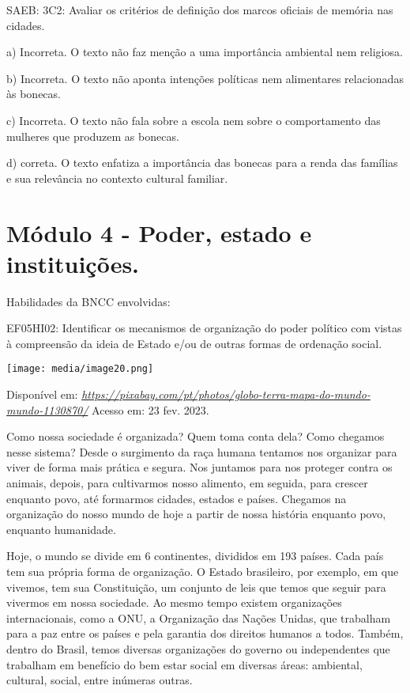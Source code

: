 SAEB: 3C2: Avaliar os critérios de definição dos marcos oficiais de
memória nas cidades.

a) Incorreta. O texto não faz menção a uma importância ambiental nem
religiosa.

b) Incorreta. O texto não aponta intenções políticas nem alimentares
relacionadas às bonecas.

c) Incorreta. O texto não fala sobre a escola nem sobre o comportamento
das mulheres que produzem as bonecas.

d) correta. O texto enfatiza a importância das bonecas para a renda das
famílias e sua relevância no contexto cultural familiar.

\section{Módulo 4 - Poder, estado e
instituições.}\label{muxf3dulo-4---poder-estado-e-instituiuxe7uxf5es.}

Habilidades da BNCC envolvidas:

EF05HI02: Identificar os mecanismos de organização do poder político com
vistas à compreensão da ideia de Estado e/ou de outras formas de
ordenação social.

\texttt{[image: media/image20.png]}

Disponível em:
\href{https://pixabay.com/pt/photos/globo-terra-mapa-do-mundo-mundo-1130870/}{\emph{https://pixabay.com/pt/photos/globo-terra-mapa-do-mundo-mundo-1130870/}}
Acesso em: 23 fev. 2023.

Como nossa sociedade é organizada? Quem toma conta dela? Como chegamos
nesse sistema? Desde o surgimento da raça humana tentamos nos organizar
para viver de forma mais prática e segura. Nos juntamos para nos
proteger contra os animais, depois, para cultivarmos nosso alimento, em
seguida, para crescer enquanto povo, até formarmos cidades, estados e
países. Chegamos na organização do nosso mundo de hoje a partir de nossa
história enquanto povo, enquanto humanidade.

Hoje, o mundo se divide em 6 continentes, divididos em 193 países. Cada
país tem sua própria forma de organização. O Estado brasileiro, por
exemplo, em que vivemos, tem sua Constituição, um conjunto de leis que
temos que seguir para vivermos em nossa sociedade. Ao mesmo tempo
existem organizações internacionais, como a ONU, a Organização das
Nações Unidas, que trabalham para a paz entre os países e pela garantia
dos direitos humanos a todos. Também, dentro do Brasil, temos diversas
organizações do governo ou independentes que trabalham em benefício do
bem estar social em diversas áreas: ambiental, cultural, social, entre
inúmeras outras.

